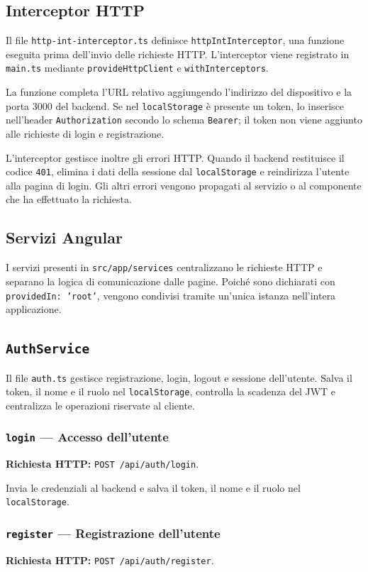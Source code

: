 \documentclass[12pt,a4paper]{article}
\begin{document}
\subsection{Interceptor HTTP}
Il file \texttt{http-int-interceptor.ts} definisce
\texttt{httpIntInterceptor}, una funzione eseguita prima dell'invio delle
richieste HTTP. L'interceptor viene registrato in \texttt{main.ts} mediante
\texttt{provideHttpClient} e \texttt{withInterceptors}.

La funzione completa l'URL relativo aggiungendo l'indirizzo del dispositivo e
la porta 3000 del backend. Se nel \texttt{localStorage} è presente un token,
lo inserisce nell'header \texttt{Authorization} secondo lo schema
\texttt{Bearer}; il token non viene aggiunto alle richieste di login e
registrazione.

L'interceptor gestisce inoltre gli errori HTTP. Quando il backend restituisce
il codice \texttt{401}, elimina i dati della sessione dal
\texttt{localStorage} e reindirizza l'utente alla pagina di login. Gli altri
errori vengono propagati al servizio o al componente che ha effettuato la
richiesta.

\subsection{Servizi Angular}
I servizi presenti in \texttt{src/app/services} centralizzano le richieste
HTTP e separano la logica di comunicazione dalle pagine. Poiché sono
dichiarati con \texttt{providedIn: 'root'}, vengono condivisi tramite un'unica
istanza nell'intera applicazione.

\subsection{\texttt{AuthService}}
Il file \texttt{auth.ts} gestisce registrazione, login, logout e sessione
dell'utente. Salva il token, il nome e il ruolo nel \texttt{localStorage},
controlla la scadenza del JWT e centralizza le operazioni riservate al cliente.

\subsubsection{\texttt{login} --- Accesso dell'utente}
\textbf{Richiesta HTTP:} \texttt{POST /api/auth/login}.

Invia le credenziali al backend e salva il token, il nome e il ruolo nel
\texttt{localStorage}.

\subsubsection{\texttt{register} --- Registrazione dell'utente}
\textbf{Richiesta HTTP:} \texttt{POST /api/auth/register}.
\end{document}
